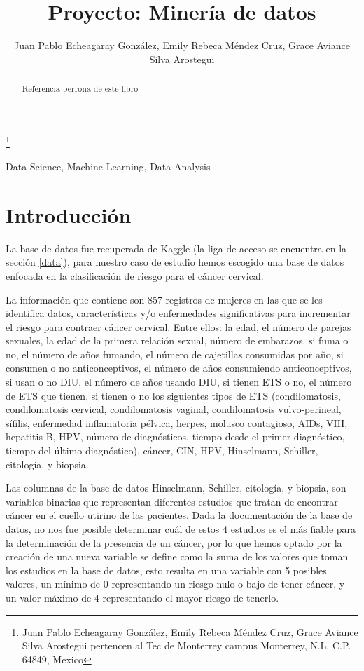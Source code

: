 \documentclass[journal]{IEEEtran}                                                          %
\title{\LARGE \bf Proyecto: Minería de datos}
\author{Juan Pablo Echeagaray González, Emily Rebeca Méndez Cruz, Grace Aviance Silva Arostegui}%
\begin{document}
    \thanks{Juan Pablo Echeagaray González, Emily Rebeca Méndez Cruz, Grace Aviance Silva Arostegui pertencen al Tec de Monterrey campus Monterrey, N.L. C.P. 64849, Mexico {\tt\small}}

    \maketitle

    \thispagestyle{empty}
    \pagestyle{empty}

    \begin{abstract}
        Referencia perrona de este libro \cite{geron-2019}
    \end{abstract}

    \begin{IEEEkeywords} 
    Data Science, Machine Learning, Data Analysis
    \end{IEEEkeywords}

    \section{Introducción} \label{introduction}

        La base de datos fue recuperada de Kaggle (la liga de acceso se encuentra en la sección \ref{data}), para nuestro caso de estudio hemos escogido una base de datos enfocada en la clasificación de riesgo para el cáncer cervical.

        La información que contiene son  857 registros de mujeres en las que se les identifica datos, características y/o enfermedades significativas para incrementar el riesgo para contraer cáncer cervical. Entre ellos: la edad, el número de parejas sexuales, la edad de la primera relación sexual, número de embarazos, si fuma o no, el número de años fumando, el número de cajetillas consumidas por año, si consumen o no anticonceptivos, el número de años consumiendo anticonceptivos, si usan o no DIU, el número de años usando DIU, si tienen ETS o no, el número de ETS que tienen, si tienen o no los siguientes tipos de ETS (condilomatosis, condilomatosis cervical, condilomatosis vaginal, condilomatosis vulvo-perineal, sífilis, enfermedad inflamatoria pélvica, herpes, molusco contagioso, AIDs, VIH, hepatitis B, HPV, número de diagnósticos, tiempo desde el primer diagnóstico, tiempo del último diagnóstico), cáncer, CIN, HPV, Hinselmann, Schiller, citología, y biopsia.

        Las columnas de la base de datos Hinselmann, Schiller, citología, y biopsia, son variables binarias que representan diferentes estudios que tratan de encontrar cáncer en el cuello utirino de las pacientes. Dada la documentación de la base de datos, no nos fue posible determinar cuál de estos 4 estudios es el más fiable para la determinación de la presencia de un cáncer, por lo que hemos optado por la creación de una nueva variable se define como la suma de los valores que toman los estudios en la base de datos, esto resulta en una variable con 5 posibles valores, un mínimo de 0 representando un riesgo nulo o bajo de tener cáncer, y un valor máximo de 4 representando el mayor riesgo de tenerlo.
\end{document}
